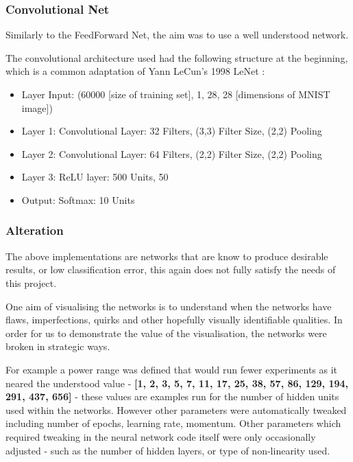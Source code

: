 \documentclass[a4paper,11pt,titlepage]{article}
\begin{document}
		\subsubsection{Convolutional Net}
		\par
		Similarly to the FeedForward Net, the aim was to use a well understood network. 
		\par 
		The convolutional architecture used had the following structure at the beginning, which is a common adaptation of Yann LeCun's 1998 LeNet \cite{LeCun1998}: 
		\begin{itemize}
			\item Layer Input: (60000 [size of training set], 1, 28, 28 [dimensions of MNIST image])
			\item Layer 1: Convolutional Layer: 32 Filters, (3,3) Filter Size, (2,2) Pooling
			\item Layer 2: Convolutional Layer: 64 Filters, (2,2) Filter Size, (2,2) Pooling
			\item Layer 3: ReLU layer: 500 Units, 50%
			\item Output: Softmax: 10 Units
		\end{itemize}
		\par 
		
		\subsubsection{Alteration}
		The above implementations are networks that are know to produce desirable results, or low classification error, this again does not fully satisfy the needs of this project.
		\par 
		One aim of visualising the networks is to understand when the networks have flaws, imperfections, quirks and other hopefully visually identifiable qualities. In order for us to demonstrate the value of the visualisation, the networks were broken in strategic ways. 
		\par 
		For example a power range was defined that would run fewer experiments as it neared the understood value - \textbf{[1, 2, 3, 5, 7, 11, 17, 25, 38, 57, 86, 129, 194, 291, 437, 656]} - these values are examples run for the number of hidden units used within the networks. However other parameters were automatically tweaked including number of epochs, learning rate, momentum. Other parameters which required tweaking in the neural network code itself were only occasionally adjusted - such as the number of hidden layers, or type of non-linearity used.
		
\end{document}
